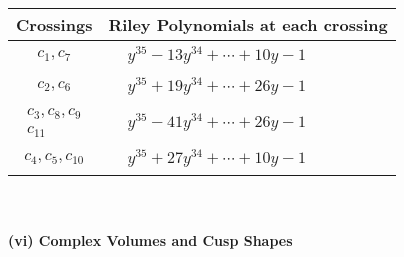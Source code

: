 \documentclass[1p]{elsarticle_modified}
\theoremstyle{definition}
\begin{document}
\begin{tabular}{m{50pt}|m{274pt}}
Crossings & \hspace{64pt}Riley Polynomials at each crossing \\
\hline $$\begin{aligned}c_{1},c_{7}\end{aligned}$$&$\begin{aligned}
&y^{35}-13 y^{34}+\cdots+10 y-1
\end{aligned}$\\
\hline $$\begin{aligned}c_{2},c_{6}\end{aligned}$$&$\begin{aligned}
&y^{35}+19 y^{34}+\cdots+26 y-1
\end{aligned}$\\
\hline $$\begin{aligned}c_{3},c_{8},c_{9}\\c_{11}\end{aligned}$$&$\begin{aligned}
&y^{35}-41 y^{34}+\cdots+26 y-1
\end{aligned}$\\
\hline $$\begin{aligned}c_{4},c_{5},c_{10}\end{aligned}$$&$\begin{aligned}
&y^{35}+27 y^{34}+\cdots+10 y-1
\end{aligned}$\\
\hline
\end{tabular}\\~\\
\newpage\flushleft \textbf{(vi) Complex Volumes and Cusp Shapes}
\end{document}
